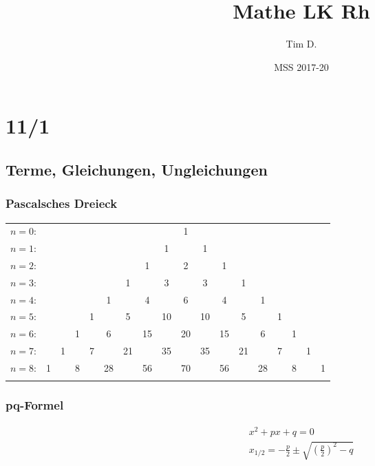 



\title{Mathe LK Rh}
\author{Tim D.}
\date{MSS 2017-20}
\maketitle

\tableofcontents
\newpage

\part{11/1}

\chapter{Terme, Gleichungen, Ungleichungen}
\section{Pascalsches Dreieck}
\begin{tabular}{rccccccccccccccccc}
  $n=0$:&    &    &    &    &    &    &    &    &  1\\\noalign{\smallskip\smallskip}
  $n=1$:&    &    &    &    &    &    &    &  1 &    &  1\\\noalign{\smallskip\smallskip}
  $n=2$:&    &    &    &    &    &    &  1 &    &  2 &    &  1\\\noalign{\smallskip\smallskip}
  $n=3$:&    &    &    &    &    &  1 &    &  3 &    &  3 &    &  1\\\noalign{\smallskip\smallskip}
  $n=4$:&    &    &    &    &  1 &    &  4 &    &  6 &    &  4 &    &  1\\\noalign{\smallskip\smallskip}
  $n=5$:&    &    &    &  1 &    &  5 &    & 10 &    & 10 &    &  5 &    &  1\\\noalign{\smallskip\smallskip}
  $n=6$:&    &    &  1 &    &  6 &    & 15 &    & 20 &    & 15 &    &  6 &    &  1\\\noalign{\smallskip\smallskip}
  $n=7$:&    &  1 &    &  7 &    & 21 &    & 35 &    & 35 &    & 21 &    &  7 &    &  1\\\noalign{\smallskip\smallskip}
  $n=8$:&  1 &    &  8 &    & 28 &    & 56 &    & 70 &    & 56 &    & 28 &    &  8 &    &  1\\\noalign{\smallskip\smallskip}
\end{tabular}
\section{pq-Formel}
\begin{gather*}
  x^2 + px + q = 0 \\
  x_{1/2} = -\frac{p}{2} \pm \sqrt{(\frac{p}{2})^2 - q}
\end{gather*}
